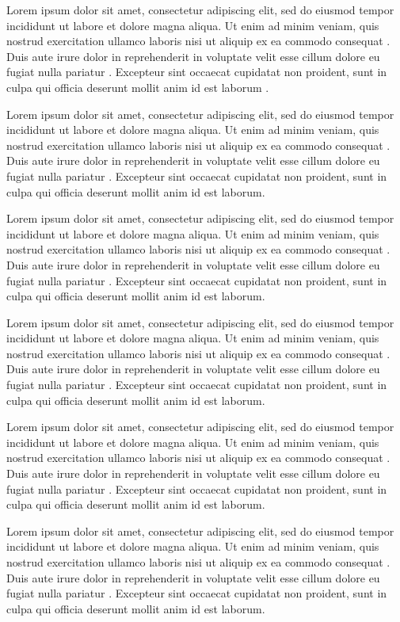 Lorem ipsum dolor sit amet, consectetur adipiscing elit, sed do eiusmod tempor incididunt ut labore et dolore magna aliqua. Ut enim ad minim veniam, quis nostrud exercitation ullamco laboris nisi ut aliquip ex ea commodo consequat \cite{ref1}. Duis aute irure dolor in reprehenderit in voluptate velit esse cillum dolore eu fugiat nulla pariatur \cite{ref2}. Excepteur sint occaecat cupidatat non proident, sunt in culpa qui officia deserunt mollit anim id est laborum \cite{ref3}.

Lorem ipsum dolor sit amet, consectetur adipiscing elit, sed do eiusmod tempor incididunt ut labore et dolore magna aliqua. Ut enim ad minim veniam, quis nostrud exercitation ullamco laboris nisi ut aliquip ex ea commodo consequat \cite{ref1}. Duis aute irure dolor in reprehenderit in voluptate velit esse cillum dolore eu fugiat nulla pariatur \cite{ref2}. Excepteur sint occaecat cupidatat non proident, sunt in culpa qui officia deserunt mollit anim id est laborum.

Lorem ipsum dolor sit amet, consectetur adipiscing elit, sed do eiusmod tempor incididunt ut labore et dolore magna aliqua. Ut enim ad minim veniam, quis nostrud exercitation ullamco laboris nisi ut aliquip ex ea commodo consequat \cite{ref1}. Duis aute irure dolor in reprehenderit in voluptate velit esse cillum dolore eu fugiat nulla pariatur \cite{ref2}. Excepteur sint occaecat cupidatat non proident, sunt in culpa qui officia deserunt mollit anim id est laborum.

Lorem ipsum dolor sit amet, consectetur adipiscing elit, sed do eiusmod tempor incididunt ut labore et dolore magna aliqua. Ut enim ad minim veniam, quis nostrud exercitation ullamco laboris nisi ut aliquip ex ea commodo consequat \cite{ref1}. Duis aute irure dolor in reprehenderit in voluptate velit esse cillum dolore eu fugiat nulla pariatur \cite{ref2}. Excepteur sint occaecat cupidatat non proident, sunt in culpa qui officia deserunt mollit anim id est laborum.

Lorem ipsum dolor sit amet, consectetur adipiscing elit, sed do eiusmod tempor incididunt ut labore et dolore magna aliqua. Ut enim ad minim veniam, quis nostrud exercitation ullamco laboris nisi ut aliquip ex ea commodo consequat \cite{ref1}. Duis aute irure dolor in reprehenderit in voluptate velit esse cillum dolore eu fugiat nulla pariatur \cite{ref2}. Excepteur sint occaecat cupidatat non proident, sunt in culpa qui officia deserunt mollit anim id est laborum.

Lorem ipsum dolor sit amet, consectetur adipiscing elit, sed do eiusmod tempor incididunt ut labore et dolore magna aliqua. Ut enim ad minim veniam, quis nostrud exercitation ullamco laboris nisi ut aliquip ex ea commodo consequat \cite{ref1}. Duis aute irure dolor in reprehenderit in voluptate velit esse cillum dolore eu fugiat nulla pariatur \cite{ref2}. Excepteur sint occaecat cupidatat non proident, sunt in culpa qui officia deserunt mollit anim id est laborum.

